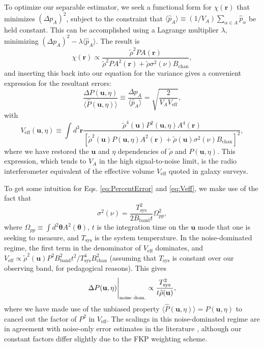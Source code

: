 \documentclass[twocolumn,aps,prd,nofootinbib,showpacs]{revtex4-1}
\begin{document}
To optimize our separable estimator, we seek a functional form for $\chi(\mathbf{r})$ that minimizes $(\Delta p_A)^2$, subject to the constraint that $\langle \widehat{p}_A \rangle \equiv (1/V_A) \sum_{\alpha \in A} \widehat{p}_\alpha$ be held constant.  This can be accomplished using a Lagrange multiplier $\lambda$, minimizing $(\Delta p_A)^2 - \lambda \langle \widehat{p}_A \rangle$.  The result is
\begin{equation}
\label{eq:optWeights}
\chi(\mathbf{r}) \propto \frac{\tilde{\rho}^2 P A(\mathbf{r}) }{\tilde{\rho}^2 P A^2(\mathbf{r}) +\tilde{\rho} \sigma^2(\nu) B_\textrm{chan} },
\end{equation}
and inserting this back into our equation for the variance gives a convenient expression for the resultant errors:
\begin{equation}
\label{eq:PercentError}
\frac{\Delta P(\mathbf{u},\eta)}{\langle \widehat{P}(\mathbf{u}, \eta) \rangle}\equiv \frac{\Delta p_A}{\langle  \widehat{p}_A \rangle} = \sqrt{\frac{2}{V_A V_\textrm{eff}}},
\end{equation}
with
\begin{equation}
\label{eq:Veff}
V_\textrm{eff} (\mathbf{u}, \eta) \equiv \int d^3 \mathbf{r} \frac{\tilde{\rho}^4 (\mathbf{u}) P^2 (\mathbf{u}, \eta) A^4 (\mathbf{r})}{[\tilde{\rho}^2 (\mathbf{u}) P (\mathbf{u}, \eta) A^2 (\mathbf{r}) + \tilde{\rho}(\mathbf{u}) \sigma^2(\nu) B_\textrm{chan}]^2},
\end{equation}
where we have restored the $\mathbf{u}$ and $\eta$ dependencies of $\tilde{\rho}$ and $P(\mathbf{u}, \eta)$.  This expression, which tends to $V_A$ in the high signal-to-noise limit, is the radio interferometer equivalent of the effective volume $V_\textrm{eff}$ quoted in galaxy surveys.

To get some intuition for Eqs. \eqref{eq:PercentError} and \eqref{eq:Veff}, we make use of the fact that
\begin{equation}
\sigma^2 (\nu) = \frac{T^2_\textrm{sys}}{2 B_\textrm{band} t} \Omega_{pp}^2,
\end{equation}
where $\Omega_{pp} \equiv \int d^2 \boldsymbol \theta A^2 ( \boldsymbol \theta)$, $t$ is the integration time on the $\mathbf{u}$ mode that one is seeking to measure, and $T_\textrm{sys}$ is the system temperature.  In the noise-dominated regime, the first term in the denominator of $V_\textrm{eff}$ dominates, 
 and $V_\textrm{eff} \propto \tilde{\rho}^2(\mathbf{u}) P^2 B_\textrm{band}^2 t^2 / T_\textrm{sys}^4 B_\textrm{chan}^2 $ (assuming that $T_\textrm{sys}$ is constant over our observing band, for pedagogical reasons).  This gives
 \begin{equation}
 \Delta P(\mathbf{u}, \eta) \Bigg{|}_\textrm{noise dom.} \propto \frac{T^2_\textrm{sys}}{t \tilde{\rho}(\mathbf{u})},
 \end{equation}
 where we have made use of the unbiased property $\langle \widehat{P}(\mathbf{u}, \eta) \rangle = P(\mathbf{u}, \eta)$ to cancel out the factor of $P^2$ in $V_\textrm{eff}$.  The scalings in this noise-dominated regime are in agreement with noise-only error estimates in the literature \cite{Morales2005,Parsons2012a}, although our constant factors differ slightly due to the FKP weighting scheme.
 
\end{document}
